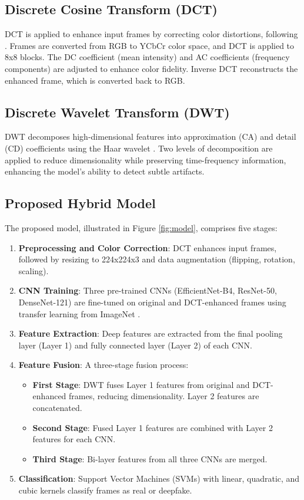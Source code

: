 \documentclass[12pt]{article}
\begin{document}
\subsection{Discrete Cosine Transform (DCT)}
DCT is applied to enhance input frames by correcting color distortions, following \citet{mukherjee2008enhancement}. Frames are converted from RGB to YCbCr color space, and DCT is applied to 8x8 blocks. The DC coefficient (mean intensity) and AC coefficients (frequency components) are adjusted to enhance color fidelity. Inverse DCT reconstructs the enhanced frame, which is converted back to RGB.

\subsection{Discrete Wavelet Transform (DWT)}
DWT decomposes high-dimensional features into approximation (CA) and detail (CD) coefficients using the Haar wavelet \citep{shensa1992discrete}. Two levels of decomposition are applied to reduce dimensionality while preserving time-frequency information, enhancing the model’s ability to detect subtle artifacts.

\subsection{Proposed Hybrid Model}
The proposed model, illustrated in Figure \ref{fig:model}, comprises five stages:
\begin{enumerate}
    \item \textbf{Preprocessing and Color Correction}: DCT enhances input frames, followed by resizing to 224x224x3 and data augmentation (flipping, rotation, scaling).
    \item \textbf{CNN Training}: Three pre-trained CNNs (EfficientNet-B4, ResNet-50, DenseNet-121) are fine-tuned on original and DCT-enhanced frames using transfer learning from ImageNet \citep{huh2016imagenet}.
    \item \textbf{Feature Extraction}: Deep features are extracted from the final pooling layer (Layer 1) and fully connected layer (Layer 2) of each CNN.
    \item \textbf{Feature Fusion}: A three-stage fusion process:
        \begin{itemize}
            \item \textbf{First Stage}: DWT fuses Layer 1 features from original and DCT-enhanced frames, reducing dimensionality. Layer 2 features are concatenated.
            \item \textbf{Second Stage}: Fused Layer 1 features are combined with Layer 2 features for each CNN.
            \item \textbf{Third Stage}: Bi-layer features from all three CNNs are merged.
        \end{itemize}
    \item \textbf{Classification}: Support Vector Machines (SVMs) with linear, quadratic, and cubic kernels classify frames as real or deepfake.
\end{enumerate}
\end{document}

